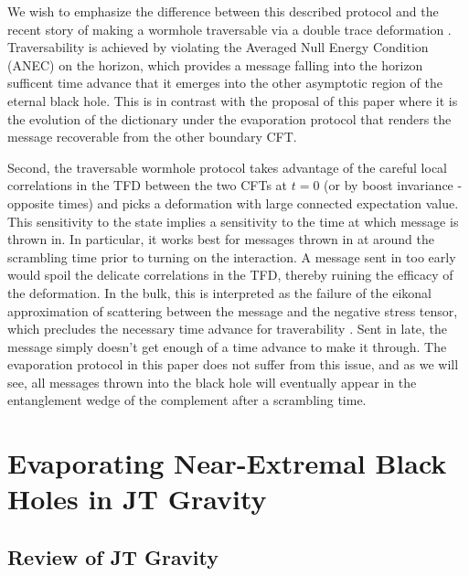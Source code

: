 \documentclass[12pt]{article}
\begin{document}
We wish to emphasize the difference between this described protocol and the recent story of making a wormhole traversable via a double trace deformation \cite{Gao:2016bin, Maldacena:2017axo}. Traversability is achieved by violating the Averaged Null Energy Condition (ANEC) on the horizon, which provides a message falling into the horizon sufficent time advance that it emerges into the other asymptotic region of the eternal black hole. This is in contrast with the proposal of this paper where it is the evolution of the dictionary under the evaporation protocol that renders the message recoverable from the other boundary CFT.

Second, the traversable wormhole protocol takes advantage of the careful local correlations in the TFD between the two CFTs at $t = 0$ (or by boost invariance -  opposite times) and picks a deformation with large connected expectation value. This sensitivity to the state  implies a sensitivity to the time at which message is thrown in.  In particular, it works best for messages thrown in at around the scrambling time prior to turning on the interaction. A message sent in too early would spoil the delicate correlations in the TFD, thereby ruining the efficacy of the deformation. In the bulk, this is interpreted as the failure of the eikonal approximation of scattering between the message and the negative stress tensor, which precludes the necessary time advance for traverability \cite{Maldacena:2017axo}. Sent in late, the message simply doesn't get enough of a time advance to make it through. The evaporation protocol in this paper does not suffer from this issue, and as we will see, all messages thrown into the black hole will eventually appear in the entanglement wedge of the complement after a scrambling time.







\section{Evaporating Near-Extremal Black Holes in JT Gravity}
\label{sec:setting}



\subsection{Review of JT Gravity}
\end{document}
